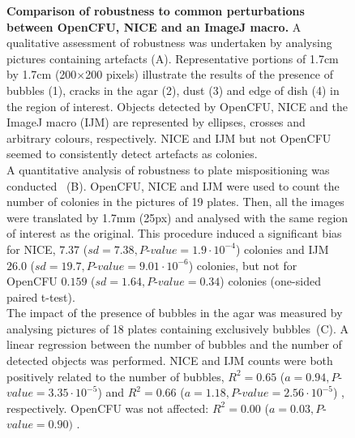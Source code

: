 \documentclass[10pt]{article}
\newcommand{\IJM}{IJM}
\newcommand{\EdgeNoiseOCFU}{$0.159$ ($sd=1.64, P$-$value=0.34$)}
\newcommand{\EdgeNoiseIJM}{$26.0$ ($sd=19.7, P$-$value=9.01\cdot 10^{-6}$)}
\newcommand{\EdgeNoiseNICE}{$7.37$ ($sd=7.38,P$-$value=1.9\cdot 10^{-4}$)}
\newcommand{\BubbleNoiseOCFU}{$R^2 = 0.00$ ($a=0.03, P$-$value=0.90)$ }
\newcommand{\BubbleNoiseNICE}{$R^2 = 0.65$ ($a=0.94, P$-$value=3.35\cdot 10^{-5}$) }
\newcommand{\BubbleNoiseIJM}{$R^2 = 0.66$ ($a=1.18, P$-$value=2.56\cdot 10^{-5}$) }
\begin{document}
\begin{figure}[!ht]
\caption{{\bf Comparison of robustness to common perturbations between OpenCFU, 
NICE\cite{clarke_lowcost_2010} and an ImageJ macro\cite{cai_optimized_2011}.} 
A qualitative assessment of robustness was undertaken by analysing pictures
containing artefacts (A).
Representative portions of 1.7cm by 1.7cm (200$\times{}$200 pixels) illustrate
the results of the presence of bubbles (1), cracks in the agar (2), dust (3) and
edge of dish (4) in the region of interest. Objects detected by OpenCFU, NICE
and the ImageJ macro (\IJM) are represented by ellipses, crosses and arbitrary
colours, respectively.
NICE and \IJM{} but not OpenCFU seemed to consistently detect artefacts as
colonies.\\
A quantitative analysis of robustness to plate mispositioning was
conducted ~(B).
OpenCFU, NICE and \IJM{} were used to count the number of colonies in the
pictures of 19 plates. Then, all the images were translated by 1.7mm (25px) and
analysed with the same region of interest as the original.
This procedure induced a significant bias for NICE, \EdgeNoiseNICE{} colonies and \IJM{}
\EdgeNoiseIJM{} colonies, but not for OpenCFU \EdgeNoiseOCFU{} colonies (one-sided paired
t-test).\\
The impact of the presence of bubbles in the agar was measured by analysing
pictures of 18 plates containing exclusively bubbles~(C).
A linear regression between the number of bubbles and the number of detected
objects was performed.
NICE and \IJM{} counts were both positively related to the number of bubbles,
\BubbleNoiseNICE{} and \BubbleNoiseIJM{}, respectively. OpenCFU was not affected:
\BubbleNoiseOCFU{}	.
}
\label{figRobust}
\end{figure}

\newpage{}
\end{document}

